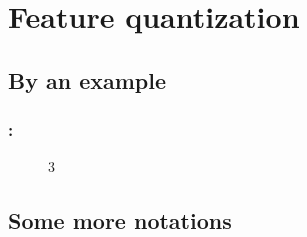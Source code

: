 \documentclass[english,xcolor={rgb,dvipsnames,table,usenames}]{beamer}
\begin{document}
 
% 
%
%
%
%
%
%
%
%
%






\section{Feature quantization}


\subsection{By an example}

{
\begin{frame}
\frametitle{\secname: \subsecname}

\begin{figure}[!ht]
\begin{animateinline}[poster=first, controls=all, palindrome, autopause, autoresume, width=\textwidth, height=6cm]{3}
%
\end{animateinline}
\end{figure}

\end{frame}
}


\subsection{Some more notations}
\end{document}
